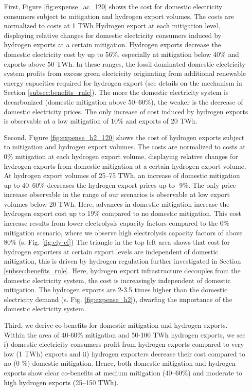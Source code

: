 First, Figure \ref{fig:expense_ac_120} shows the cost for domestic electricity consumers subject to mitigation and hydrogen export volumes. The costs are normalized to costs at 1 TWh Hydrogen export at each mitigation level, displaying relative changes for domestic electricity consumers induced by hydrogen exports at a certain mitigation.
Hydrogen exports decrease the domestic electricity cost by up to 56\%, especially at mitigation below 40\% and exports above 50 TWh. In these ranges, the fossil dominated domestic electricity system profits from excess green electricity originating from additional renewable energy capacities required for hydrogen export (see details on the mechanism in Section \ref{subsec:benefits_rule}). The more the domestic electricity system is decarbonized (domestic mitigation above 50--60\%), the weaker is the decrease of domestic electricity prices.
The only increase of cost induced by hydrogen exports is observable at a low mitigation of 10\% and exports of 20 TWh. 

Second, Figure \ref{fig:expense_h2_120} shows the cost of hydrogen exports subject to mitigation and hydrogen export volumes. The costs are normalized to costs at 0\% mitigation at each hydrogen export volume, displaying relative changes for hydrogen exports from domestic mitigation at a certain hydrogen export volume.
At hydrogen export volumes of 25--75 TWh, an increase of domestic mitigation up to 40--60\% decreases the hydrogen export prices up to -9\%. 
The only price increase observable in the range of our scenarios is observable at low export volumes below 20 TWh. Here, advances in domestic mitigation increase the hydrogen export cost up to 19\% compared to no domestic mitigation.
This cost increase results from lower electrolysis capacity factors compared to the 0\% mitigation scenario, where we observe high electrolysis capacity factors of above 80\% (s. Fig. \ref{fig:ely-cf})
The triangle in the top left area shows that cost for hydrogen exporters at certain export levels are independent of domestic mitigation, this is driven by hydrogen regulation further investigated in Section \ref{subsec:benefits_rule}. Here, hydrogen export infrastructure decouples from the domestic electricity system, the cost is increasingly independent of domestic mitigation. The hydrogen exports are 2-3.5 times higher than the domestic electricity demand (s. Fig. \ref{fig:expense_h2}), dwarfing the importance of the domestic electricity system.


Third, we derive co-benefits for domestic mitigation and hydrogen exports. 
Within the area of 40-60\% mitigation and 50-100 TWh hydrogen exports, we see i) domestic electricity consumers profit from hydrogen exports compared to very low (1 TWh) exports and ii) hydrogen exporters decrease their cost compared to no (0 \%) domestic mitigation. Hence, both domestic mitigation and hydrogen exports show clear co-benefits at medium mitigation (40--60\%) and moderate to high hydrogen exports (25--150 TWh). 

